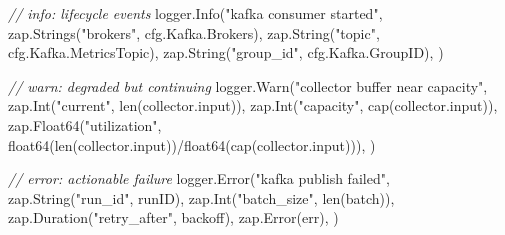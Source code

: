 \documentclass[
]{article}
\newenvironment{Shaded}{}{}
\newcommand{\BuiltInTok}[1]{\textcolor[rgb]{0.00,0.50,0.00}{#1}}
\newcommand{\CommentTok}[1]{\textcolor[rgb]{0.38,0.63,0.69}{\textit{#1}}}
\newcommand{\DataTypeTok}[1]{\textcolor[rgb]{0.56,0.13,0.00}{#1}}
\newcommand{\NormalTok}[1]{#1}
\newcommand{\OperatorTok}[1]{\textcolor[rgb]{0.40,0.40,0.40}{#1}}
\newcommand{\StringTok}[1]{\textcolor[rgb]{0.25,0.44,0.63}{#1}}
\begin{document}
\begin{Shaded}
\begin{Highlighting}[]
\CommentTok{// info: lifecycle events}
\NormalTok{logger}\OperatorTok{.}\NormalTok{Info}\OperatorTok{(}\StringTok{"kafka consumer started"}\OperatorTok{,}
\NormalTok{    zap}\OperatorTok{.}\NormalTok{Strings}\OperatorTok{(}\StringTok{"brokers"}\OperatorTok{,}\NormalTok{ cfg}\OperatorTok{.}\NormalTok{Kafka}\OperatorTok{.}\NormalTok{Brokers}\OperatorTok{),}
\NormalTok{    zap}\OperatorTok{.}\NormalTok{String}\OperatorTok{(}\StringTok{"topic"}\OperatorTok{,}\NormalTok{ cfg}\OperatorTok{.}\NormalTok{Kafka}\OperatorTok{.}\NormalTok{MetricsTopic}\OperatorTok{),}
\NormalTok{    zap}\OperatorTok{.}\NormalTok{String}\OperatorTok{(}\StringTok{"group\_id"}\OperatorTok{,}\NormalTok{ cfg}\OperatorTok{.}\NormalTok{Kafka}\OperatorTok{.}\NormalTok{GroupID}\OperatorTok{),}
\OperatorTok{)}

\CommentTok{// warn: degraded but continuing}
\NormalTok{logger}\OperatorTok{.}\NormalTok{Warn}\OperatorTok{(}\StringTok{"collector buffer near capacity"}\OperatorTok{,}
\NormalTok{    zap}\OperatorTok{.}\NormalTok{Int}\OperatorTok{(}\StringTok{"current"}\OperatorTok{,} \BuiltInTok{len}\OperatorTok{(}\NormalTok{collector}\OperatorTok{.}\NormalTok{input}\OperatorTok{)),}
\NormalTok{    zap}\OperatorTok{.}\NormalTok{Int}\OperatorTok{(}\StringTok{"capacity"}\OperatorTok{,} \BuiltInTok{cap}\OperatorTok{(}\NormalTok{collector}\OperatorTok{.}\NormalTok{input}\OperatorTok{)),}
\NormalTok{    zap}\OperatorTok{.}\NormalTok{Float64}\OperatorTok{(}\StringTok{"utilization"}\OperatorTok{,} \DataTypeTok{float64}\OperatorTok{(}\BuiltInTok{len}\OperatorTok{(}\NormalTok{collector}\OperatorTok{.}\NormalTok{input}\OperatorTok{))/}\DataTypeTok{float64}\OperatorTok{(}\BuiltInTok{cap}\OperatorTok{(}\NormalTok{collector}\OperatorTok{.}\NormalTok{input}\OperatorTok{))),}
\OperatorTok{)}

\CommentTok{// error: actionable failure}
\NormalTok{logger}\OperatorTok{.}\NormalTok{Error}\OperatorTok{(}\StringTok{"kafka publish failed"}\OperatorTok{,}
\NormalTok{    zap}\OperatorTok{.}\NormalTok{String}\OperatorTok{(}\StringTok{"run\_id"}\OperatorTok{,}\NormalTok{ runID}\OperatorTok{),}
\NormalTok{    zap}\OperatorTok{.}\NormalTok{Int}\OperatorTok{(}\StringTok{"batch\_size"}\OperatorTok{,} \BuiltInTok{len}\OperatorTok{(}\NormalTok{batch}\OperatorTok{)),}
\NormalTok{    zap}\OperatorTok{.}\NormalTok{Duration}\OperatorTok{(}\StringTok{"retry\_after"}\OperatorTok{,}\NormalTok{ backoff}\OperatorTok{),}
\NormalTok{    zap}\OperatorTok{.}\NormalTok{Error}\OperatorTok{(}\NormalTok{err}\OperatorTok{),}
\OperatorTok{)}
\end{Highlighting}
\end{Shaded}
\end{document}
